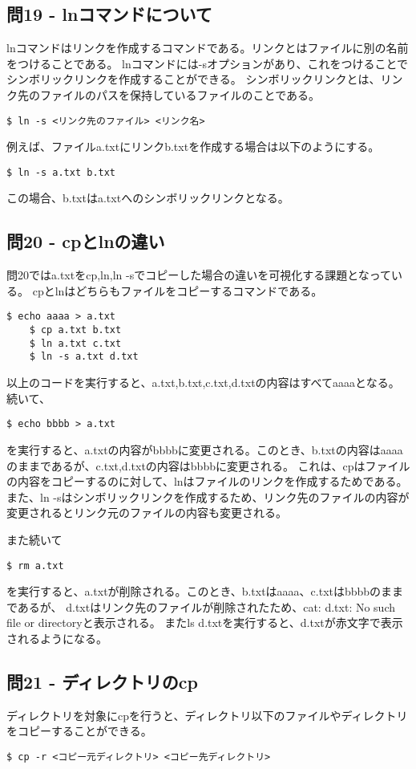 \documentclass[a4paper,11pt]{jsarticle}
\begin{document}
\subsection*{問19 - lnコマンドについて}
lnコマンドはリンクを作成するコマンドである。リンクとはファイルに別の名前をつけることである。
lnコマンドには-sオプションがあり、これをつけることでシンボリックリンクを作成することができる。
シンボリックリンクとは、リンク先のファイルのパスを保持しているファイルのことである。
\begin{lstlisting}[caption=問19の解答]
$ ln -s <リンク先のファイル> <リンク名>
\end{lstlisting}
例えば、ファイルa.txtにリンクb.txtを作成する場合は以下のようにする。
\begin{lstlisting}[caption=問19の解答]
$ ln -s a.txt b.txt
\end{lstlisting}
この場合、b.txtはa.txtへのシンボリックリンクとなる。

\subsection*{問20 - cpとlnの違い}
問20ではa.txtをcp,ln,ln -sでコピーした場合の違いを可視化する課題となっている。
cpとlnはどちらもファイルをコピーするコマンドである。
\begin{lstlisting}[caption=問20の解答]
    $ echo aaaa > a.txt
    $ cp a.txt b.txt
    $ ln a.txt c.txt
    $ ln -s a.txt d.txt
\end{lstlisting}
以上のコードを実行すると、a.txt,b.txt,c.txt,d.txtの内容はすべてaaaaとなる。続いて、
\begin{lstlisting}[caption=問20の解答]
    $ echo bbbb > a.txt
\end{lstlisting}
を実行すると、a.txtの内容がbbbbに変更される。このとき、b.txtの内容はaaaaのままであるが、c.txt,d.txtの内容はbbbbに変更される。
これは、cpはファイルの内容をコピーするのに対して、lnはファイルのリンクを作成するためである。
また、ln -sはシンボリックリンクを作成するため、リンク先のファイルの内容が変更されるとリンク元のファイルの内容も変更される。

また続いて
\begin{lstlisting}[caption=問20の解答]
    $ rm a.txt
\end{lstlisting}
を実行すると、a.txtが削除される。このとき、b.txtはaaaa、c.txtはbbbbのままであるが、
d.txtはリンク先のファイルが削除されたため、cat: d.txt: No such file or directoryと表示される。
またls d.txtを実行すると、d.txtが赤文字で表示されるようになる。

\subsection*{問21 - ディレクトリのcp}
ディレクトリを対象にcpを行うと、ディレクトリ以下のファイルやディレクトリをコピーすることができる。
\begin{lstlisting}[caption=問21の解答]
$ cp -r <コピー元ディレクトリ> <コピー先ディレクトリ>
\end{lstlisting}
\end{document}
